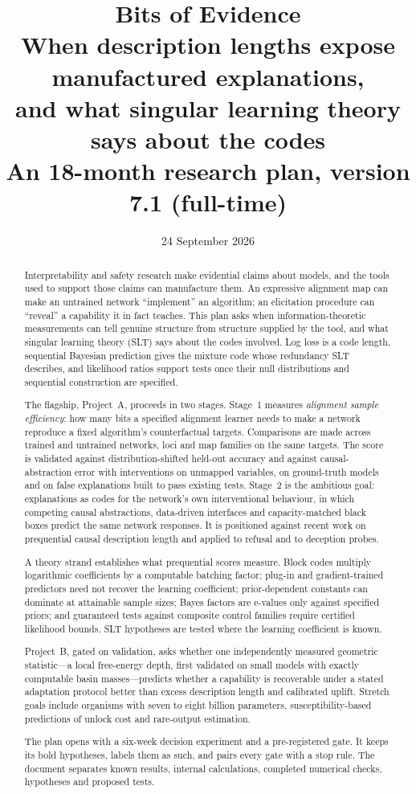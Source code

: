 \documentclass[11pt,a4paper]{article}
\title{\textbf{Bits of Evidence}\\[0.4em]
\large When description lengths expose manufactured explanations,\\
and what singular learning theory says about the codes\\[0.3em]
\normalsize An 18-month research plan, version 7.1 (full-time)}
\author{}
\date{24 September 2026}
\begin{document}
\maketitle
\begin{abstract}
\noindent
Interpretability and safety research make evidential claims about models,
and the tools used to support those claims can manufacture them. An
expressive alignment map can make an untrained network ``implement'' an
algorithm; an elicitation procedure can ``reveal'' a capability it in fact
teaches. This plan asks when information-theoretic measurements can tell
genuine structure from structure supplied by the tool, and what singular
learning theory (SLT) says about the codes involved. Log loss is a code
length, sequential Bayesian prediction gives the mixture code whose
redundancy SLT describes, and likelihood ratios support tests once their
null distributions and sequential construction are specified.

The flagship, Project~A, proceeds in two stages. Stage~1 measures
\emph{alignment sample efficiency}: how many bits a specified alignment
learner needs to make a network reproduce a fixed algorithm's
counterfactual targets. Comparisons are made across trained and untrained
networks, loci and map families on the same targets. The score is
validated against distribution-shifted held-out accuracy and against
causal-abstraction error with interventions on unmapped variables, on
ground-truth models and on false explanations built to pass existing
tests. Stage~2 is the ambitious goal: explanations as codes for the
network's own interventional behaviour, in which competing causal
abstractions, data-driven interfaces and capacity-matched black boxes
predict the same network responses. It is positioned against recent work
on prequential causal description length and applied to refusal and to
deception probes.

A theory strand establishes what prequential scores measure. Block codes
multiply logarithmic coefficients by a computable batching factor;
plug-in and gradient-trained predictors need not recover the learning
coefficient; prior-dependent constants can dominate at attainable sample
sizes; Bayes factors are e-values only against specified priors; and
guaranteed tests against composite control families require certified
likelihood bounds. SLT hypotheses are tested where the learning
coefficient is known.

Project~B, gated on validation, asks whether one independently measured
geometric statistic---a local free-energy depth, first validated on small
models with exactly computable basin masses---predicts whether a
capability is recoverable under a stated adaptation protocol better than
excess description length and calibrated uplift. Stretch goals include
organisms with seven to eight billion parameters, susceptibility-based
predictions of unlock cost and rare-output estimation.

The plan opens with a six-week decision experiment and a pre-registered
gate. It keeps its bold hypotheses, labels them as such, and pairs every gate with a stop rule. The document separates known results,
internal calculations, completed numerical checks, hypotheses and proposed
tests.
\end{abstract}
\end{document}
